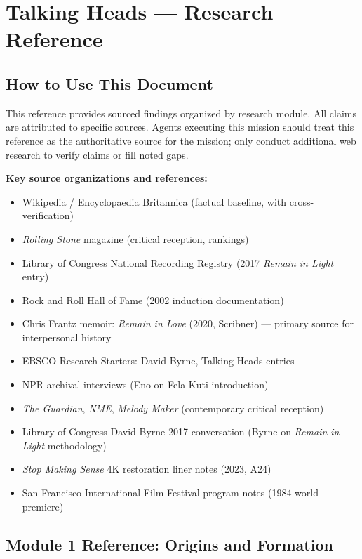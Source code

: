 \documentclass[11pt,letterpaper]{article}
\begin{document}
\section{Talking Heads --- Research Reference}

\subsection{How to Use This Document}

This reference provides sourced findings organized by research module. All claims are attributed to specific sources. Agents executing this mission should treat this reference as the authoritative source for the mission; only conduct additional web research to verify claims or fill noted gaps.

\textbf{Key source organizations and references:}
\begin{itemize}[leftmargin=*]
  \item Wikipedia / Encyclopaedia Britannica (factual baseline, with cross-verification)
  \item \textit{Rolling Stone} magazine (critical reception, rankings)
  \item Library of Congress National Recording Registry (2017 \textit{Remain in Light} entry)
  \item Rock and Roll Hall of Fame (2002 induction documentation)
  \item Chris Frantz memoir: \textit{Remain in Love} (2020, Scribner) --- primary source for interpersonal history
  \item EBSCO Research Starters: David Byrne, Talking Heads entries
  \item NPR archival interviews (Eno on Fela Kuti introduction)
  \item \textit{The Guardian}, \textit{NME}, \textit{Melody Maker} (contemporary critical reception)
  \item Library of Congress David Byrne 2017 conversation (Byrne on \textit{Remain in Light} methodology)
  \item \textit{Stop Making Sense} 4K restoration liner notes (2023, A24)
  \item San Francisco International Film Festival program notes (1984 world premiere)
\end{itemize}

\subsection{Module 1 Reference: Origins and Formation}
\end{document}
